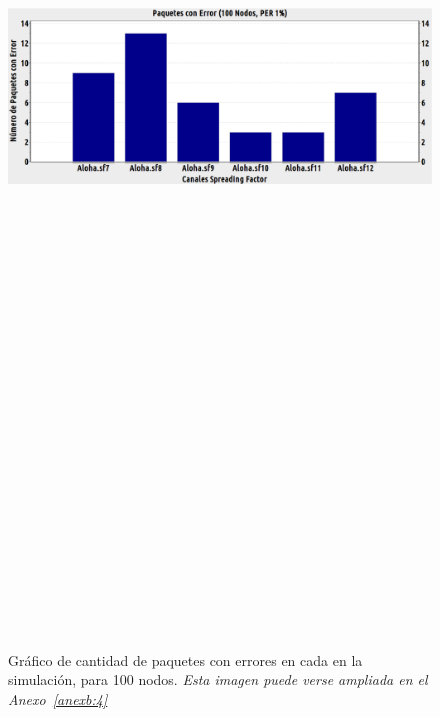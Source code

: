 \begin{justify}
\noindent
\begin{figure}[!ht]
\centering
\includegraphics[width=13cm,height=30cm,keepaspectratio]{images/errores100nodos.eps}
\caption{Gráfico de cantidad de paquetes con errores en cada  en la simulación, para 100 nodos. \textit{Esta imagen puede verse ampliada en el Anexo~\ref{anexb:4}}}
\label{prueba:5}
\end{figure}
\end{justify}